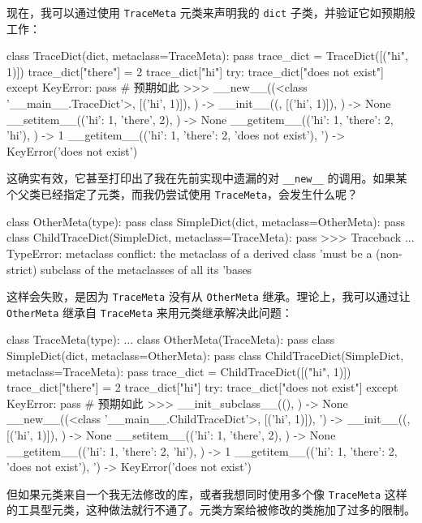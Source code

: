 现在，我可以通过使用 \texttt{TraceMeta} 元类来声明我的 \texttt{dict} 子类，并验证它如预期般工作：

\begin{codebox}[python]
class TraceDict(dict, metaclass=TraceMeta):
    pass
trace_dict = TraceDict([("hi", 1)])
trace_dict["there"] = 2
trace_dict["hi"]
try:
    trace_dict["does not exist"]
except KeyError:
    pass  # 预期如此
>>>
__new__((<class '__main__.TraceDict'>, [('hi', 1)]), {}) -> {}
__init__(({}, [('hi', 1)]), {}) -> None
__setitem__(({'hi': 1}, 'there', 2), {}) -> None
__getitem__(({'hi': 1, 'there': 2}, 'hi'), {}) -> 1
__getitem__(({'hi': 1, 'there': 2}, 'does not exist'),
'{}) -> KeyError('does not exist')
\end{codebox}

这确实有效，它甚至打印出了我在先前实现中遗漏的对 \texttt{\_\_new\_\_} 的调用。如果某个父类已经指定了元类，而我仍尝试使用 \texttt{TraceMeta}，会发生什么呢？

\begin{codebox}[python]
class OtherMeta(type):
    pass
class SimpleDict(dict, metaclass=OtherMeta):
    pass
class ChildTraceDict(SimpleDict, metaclass=TraceMeta):
    pass
>>>
Traceback ...
TypeError: metaclass conflict: the metaclass of a derived class
'must be a (non-strict) subclass of the metaclasses of all its
'bases
\end{codebox}

这样会失败，是因为 \texttt{TraceMeta} 没有从 \texttt{OtherMeta} 继承。理论上，我可以通过让 \texttt{OtherMeta} 继承自 \texttt{TraceMeta} 来用元类继承解决此问题：

\begin{codebox}[python]
class TraceMeta(type):
    ...
class OtherMeta(TraceMeta):
    pass
class SimpleDict(dict, metaclass=OtherMeta):
    pass
class ChildTraceDict(SimpleDict, metaclass=TraceMeta):
    pass
trace_dict = ChildTraceDict([("hi", 1)])
trace_dict["there"] = 2
trace_dict["hi"]
try:
    trace_dict["does not exist"]
except KeyError:
    pass  # 预期如此
>>>
__init_subclass__((), {}) -> None
__new__((<class '__main__.ChildTraceDict'>, [('hi', 1)]),
'{}) -> {}
__init__(({}, [('hi', 1)]), {}) -> None
__setitem__(({'hi': 1}, 'there', 2), {}) -> None
__getitem__(({'hi': 1, 'there': 2}, 'hi'), {}) -> 1
__getitem__(({'hi': 1, 'there': 2}, 'does not exist'),
'{}) -> KeyError('does not exist')
\end{codebox}

但如果元类来自一个我无法修改的库，或者我想同时使用多个像 \texttt{TraceMeta} 这样的工具型元类，这种做法就行不通了。元类方案给被修改的类施加了过多的限制。

